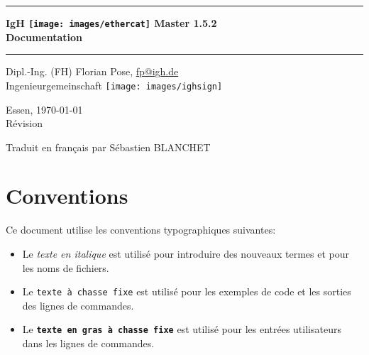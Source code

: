 \documentclass[a4paper,12pt,BCOR=6mm,bibtotoc,idxtotoc]{scrbook}
\makeatletter
\renewcommand*{\lstlistoflistings}{%
  \begingroup
    \if@twocolumn
      \@restonecoltrue\onecolumn
    \else
      \@restonecolfalse
    \fi
    \lol@heading
    \setlength{\parskip}{\z@}%
    \setlength{\parindent}{\z@}%
    \setlength{\parfillskip}{\z@ \@plus 1fil}%
    \@starttoc{lol}%
    \if@restonecol\twocolumn\fi
  \endgroup
}
\newcommand{\IgH}{\raisebox{-0.7667ex}
  {\texttt{[image: images/ighsign]}}}
\newcommand{\masterversion}{1.5.2}
\makeatother
\begin{document}
\pagestyle{empty}

\begin{titlepage}
  \begin{center}
    \rule{\textwidth}{1.5mm}

    {\Huge\sf\textbf{IgH \texttt{[image: images/ethercat]}
      Master \masterversion}\\[1ex]
      \textbf{Documentation}}

    \vspace{1ex}
    \rule{\textwidth}{1.5mm}

    \vspace{\fill} {\Large Dipl.-Ing. (FH) Florian Pose,
    \url{fp@igh.de}\\[1ex] Ingenieurgemeinschaft \IgH}

    \vspace{\fill}
    {\Large Essen, \today\\[1ex]
      R\'evision \gitversion}

    \vspace{\fill} {\Large Traduit en fran\c{c}ais par S\'ebastien BLANCHET }


  \end{center}
\end{titlepage}


\pagestyle{scrplain}

\tableofcontents
\listoftables
\listoffigures


\newpage
\pagestyle{scrheadings}

\section*{Conventions}

Ce document utilise les conventions typographiques suivantes:

\begin{itemize}

\item Le \textit{texte en italique} est utilis\'e pour introduire des nouveaux termes et pour les noms de fichiers.

\item Le \texttt{texte \`a chasse fixe} est utilis\'e pour les exemples de code et les sorties des lignes de commandes.

\item Le \texttt{\textbf{texte en gras \`a chasse fixe}} est utilis\'e pour les entr\'ees utilisateurs dans les lignes de commandes.

\end{itemize}
\end{document}
